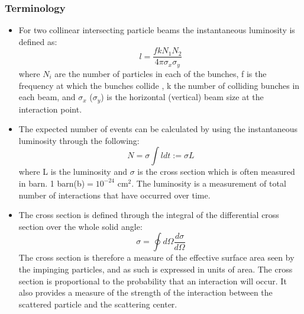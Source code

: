 \documentclass[•]{beamer}
\theoremstyle{remark}
\begin{document}
\begin{frame}[allowframebreaks]\frametitle{Terminology}
\begin{itemize}
\item For two collinear intersecting particle beams the instantaneous luminosity is defined as:
\begin{equation}
l = \frac{fkN_1 N_2}{4\pi \sigma_x \sigma_y}
\end{equation} 
where $N_i$ are the number of particles in each of the bunches, f is the frequency at which the bunches collide , k the number of colliding bunches in each beam, and $\sigma_x$ ($\sigma_y$) is the horizontal (vertical) beam size at the interaction point. 

\item The expected number of events can be calculated by using the instantaneous luminosity through the following:
\begin{equation}
N=\sigma \int l dt := \sigma L
\end{equation}
where L is the luminosity and $\sigma$ is the cross section which is often measured in barn. 1 barn(b)$=10^{-24}$ cm$^2$. The luminosity is a measurement of total number of interactions that have occurred over time.

\item The cross section is defined through the integral of the differential cross section over the whole solid angle:
\begin{equation}
\sigma = \oint d\Omega \frac{d\sigma}{d\Omega}
\end{equation}
The cross section is therefore a measure of the effective surface area seen by the impinging particles, and as such is expressed in units of area. The cross section is proportional to the probability that an interaction will occur. It also provides a measure of the strength of the interaction between the scattered particle and the scattering center.

\end{itemize}


\end{frame}
\end{document}

